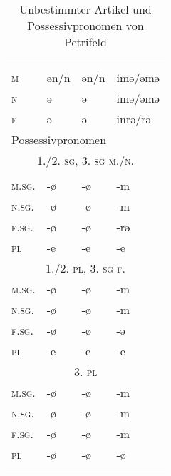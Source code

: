 \begin{table}[H]
	\caption{Unbestimmter Artikel und Possessivpronomen von Petrifeld \citep[64-66]{Moser1937}}\label{table115}
	\begin{tabular}{llll}
		\lsptoprule
		\multicolumn{4}{l}{unbestimmter Artikel}\\	
		& \NOM & \AKK & \DAT\\\midrule
		 \textsc{m} & ǝn/n & ǝn/n & imǝ/ǝmǝ\\
		 \textsc{n} & ǝ & ǝ & imǝ/ǝmǝ\\
		 \textsc{f} & ǝ & ǝ & inrǝ/rǝ\\ \midrule
		\multicolumn{4}{l}{Possessivpronomen}\\
		\multicolumn{4}{c}{\scshape 1./2. \textsc{sg}, 3. \textsc{sg} m./n.} \\\cmidrule(lr){1-4}
		& \NOM & \AKK & \DAT\\\midrule
		\textsc{m.sg.} & {}-ø & {}-ø & {}-m\\
		\textsc{n.sg.} & {}-ø & {}-ø & {}-m\\
		\textsc{f.sg.} & {}-ø & {}-ø & {}-rǝ\\
		\textsc{pl} & {}-e & {}-e & {}-e\\ \midrule
		\multicolumn{4}{c}{\scshape1./2. \textsc{pl}, 3. \textsc{sg} f.} \\\cmidrule(lr){1-4}
		\textsc{m.sg.} & {}-ø & {}-ø & {}-m\\
		\textsc{n.sg.} & {}-ø & {}-ø & {}-m\\
		\textsc{f.sg.} & {}-ø & {}-ø & {}-ǝ\\
		\textsc{pl} & {}-e & {}-e & {}-e\\ \midrule
		\multicolumn{4}{c}{\scshape 3. \textsc{pl}} \\\cmidrule(lr){1-4}
		\textsc{m.sg.} & {}-ø & {}-ø & {}-m\\
		\textsc{n.sg.} & {}-ø & {}-ø & {}-m\\
		\textsc{f.sg.} & {}-ø & {}-ø & {}-m\\
		\textsc{pl} & {}-ø & {}-ø & {}-ø\\
		\lspbottomrule
	\end{tabular}
\end{table}


